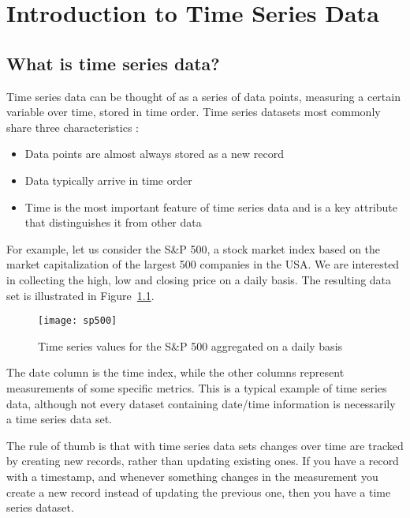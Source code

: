 


\chapter{Introduction to Time Series Data}

\section{What is time series data?}
Time series data can be thought of as a series of data points, measuring a certain variable
over time, stored in time order. Time series datasets most commonly share three
characteristics \cite{AjayKulkarni2018What} :
\begin{itemize}
	\item Data points are almost always stored as a new record
	\item Data typically arrive in time order
	\item Time is the most important feature of time series data and is a key attribute that distinguishes it from other data
\end{itemize}

For example, let us consider the S\&P 500, a stock market index based on the market
capitalization of the largest 500 companies in the USA. We are interested in collecting the high, low and
closing price on a daily basis. The resulting data set is illustrated in Figure~\ref{sp500}.

\begin{figure}
\begin{center}
\texttt{[image: sp500]}
\caption[sp500]{Time series values for the S\&P 500 aggregated on a daily basis}
\label{sp500}
\end{center}
\end{figure}

The date column is the time index, while the other columns represent measurements of some
specific metrics. This is a typical example of time series data, although not every dataset
containing date/time information is necessarily a time series data set.

The rule of thumb is that with time series data sets changes over time are tracked by creating
new records, rather than updating existing ones. If you have a record with a timestamp, and
whenever something changes in the measurement you create a new record instead of updating the
previous one, then you have a time series dataset.


